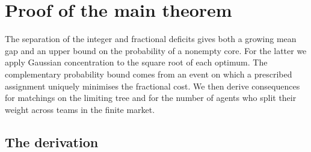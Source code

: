 \section{Proof of the main theorem}\label{sec:proofmain}

The separation of the integer and fractional deficits gives both a growing mean gap
and an upper bound on the probability of a nonempty core. For the latter we apply
Gaussian concentration to the square root of each optimum. The complementary
probability bound comes from an event on which a prescribed assignment uniquely
minimises the fractional cost. We then derive consequences for matchings on
the limiting tree and for the number of agents who split their weight across teams
in the finite market.

\subsection{The derivation}\label{sec:proofmain-derivation}

